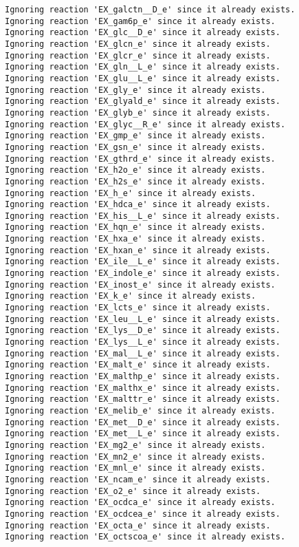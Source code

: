 \documentclass[
  letterpaper,
  DIV=11,
  numbers=noendperiod]{scrartcl}
\begin{document}
\begin{verbatim}
Ignoring reaction 'EX_galctn__D_e' since it already exists.
Ignoring reaction 'EX_gam6p_e' since it already exists.
Ignoring reaction 'EX_glc__D_e' since it already exists.
Ignoring reaction 'EX_glcn_e' since it already exists.
Ignoring reaction 'EX_glcr_e' since it already exists.
Ignoring reaction 'EX_gln__L_e' since it already exists.
Ignoring reaction 'EX_glu__L_e' since it already exists.
Ignoring reaction 'EX_gly_e' since it already exists.
Ignoring reaction 'EX_glyald_e' since it already exists.
Ignoring reaction 'EX_glyb_e' since it already exists.
Ignoring reaction 'EX_glyc__R_e' since it already exists.
Ignoring reaction 'EX_gmp_e' since it already exists.
Ignoring reaction 'EX_gsn_e' since it already exists.
Ignoring reaction 'EX_gthrd_e' since it already exists.
Ignoring reaction 'EX_h2o_e' since it already exists.
Ignoring reaction 'EX_h2s_e' since it already exists.
Ignoring reaction 'EX_h_e' since it already exists.
Ignoring reaction 'EX_hdca_e' since it already exists.
Ignoring reaction 'EX_his__L_e' since it already exists.
Ignoring reaction 'EX_hqn_e' since it already exists.
Ignoring reaction 'EX_hxa_e' since it already exists.
Ignoring reaction 'EX_hxan_e' since it already exists.
Ignoring reaction 'EX_ile__L_e' since it already exists.
Ignoring reaction 'EX_indole_e' since it already exists.
Ignoring reaction 'EX_inost_e' since it already exists.
Ignoring reaction 'EX_k_e' since it already exists.
Ignoring reaction 'EX_lcts_e' since it already exists.
Ignoring reaction 'EX_leu__L_e' since it already exists.
Ignoring reaction 'EX_lys__D_e' since it already exists.
Ignoring reaction 'EX_lys__L_e' since it already exists.
Ignoring reaction 'EX_mal__L_e' since it already exists.
Ignoring reaction 'EX_malt_e' since it already exists.
Ignoring reaction 'EX_malthp_e' since it already exists.
Ignoring reaction 'EX_malthx_e' since it already exists.
Ignoring reaction 'EX_malttr_e' since it already exists.
Ignoring reaction 'EX_melib_e' since it already exists.
Ignoring reaction 'EX_met__D_e' since it already exists.
Ignoring reaction 'EX_met__L_e' since it already exists.
Ignoring reaction 'EX_mg2_e' since it already exists.
Ignoring reaction 'EX_mn2_e' since it already exists.
Ignoring reaction 'EX_mnl_e' since it already exists.
Ignoring reaction 'EX_ncam_e' since it already exists.
Ignoring reaction 'EX_o2_e' since it already exists.
Ignoring reaction 'EX_ocdca_e' since it already exists.
Ignoring reaction 'EX_ocdcea_e' since it already exists.
Ignoring reaction 'EX_octa_e' since it already exists.
Ignoring reaction 'EX_octscoa_e' since it already exists.

\end{verbatim}
\end{document}
